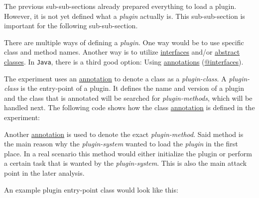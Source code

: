 The previous sub-sub-sections already prepared everything to load a plugin.
However, it is not yet defined what a \textit{plugin} actually is.
This sub-sub-section is important for the following sub-sub-section.

There are multiple ways of defining a \textit{plugin}.
One way would be to use specific class and method names.
Another way is to utilize \underline{interfaces} and/or \underline{abstract classes}.
In \texttt{Java}, there is a third good option: 
Using \underline{annotations} (\underline{@interfaces}).

The experiment uses an \underline{annotation} to denote a class as a \textit{plugin-class}.
A \textit{plugin-class} is the entry-point of a plugin.
It defines the name and version of a plugin and the class that is annotated will be searched for \textit{plugin-methods}, which will be handled next.
The following code shows how the class \underline{annotation} is defined in the experiment:


Another \underline{annotation} is used to denote the exact \textit{plugin-method}.
Said method is the main reason why the \textit{plugin-system} wanted to load the \textit{plugin} in the first place.
In a real scenario this method would either initialize the plugin or perform a certain task that is wanted by the \textit{plugin-system}.
This is also the main attack point in the later analysis.


\clearpage

An example plugin entry-point class would look like this:
